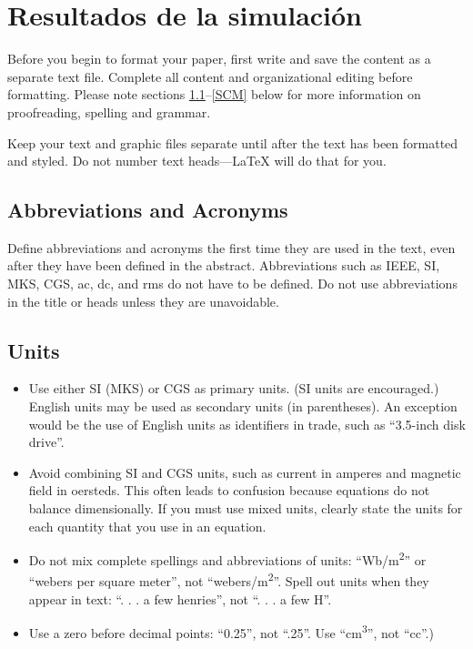 \documentclass[conference]{IEEEtran}
\begin{document}
\section{Resultados de la simulación}
Before you begin to format your paper, first write and save the content as a 
separate text file. Complete all content and organizational editing before 
formatting. Please note sections \ref{AA}--\ref{SCM} below for more information on 
proofreading, spelling and grammar.

Keep your text and graphic files separate until after the text has been 
formatted and styled. Do not number text heads---{\LaTeX} will do that 
for you.

\subsection{Abbreviations and Acronyms}\label{AA}
Define abbreviations and acronyms the first time they are used in the text, 
even after they have been defined in the abstract. Abbreviations such as 
IEEE, SI, MKS, CGS, ac, dc, and rms do not have to be defined. Do not use 
abbreviations in the title or heads unless they are unavoidable.

\subsection{Units}
\begin{itemize}
\item Use either SI (MKS) or CGS as primary units. (SI units are encouraged.) English units may be used as secondary units (in parentheses). An exception would be the use of English units as identifiers in trade, such as ``3.5-inch disk drive''.
\item Avoid combining SI and CGS units, such as current in amperes and magnetic field in oersteds. This often leads to confusion because equations do not balance dimensionally. If you must use mixed units, clearly state the units for each quantity that you use in an equation.
\item Do not mix complete spellings and abbreviations of units: ``Wb/m\textsuperscript{2}'' or ``webers per square meter'', not ``webers/m\textsuperscript{2}''. Spell out units when they appear in text: ``. . . a few henries'', not ``. . . a few H''.
\item Use a zero before decimal points: ``0.25'', not ``.25''. Use ``cm\textsuperscript{3}'', not ``cc''.)
\end{itemize}
\end{document}
